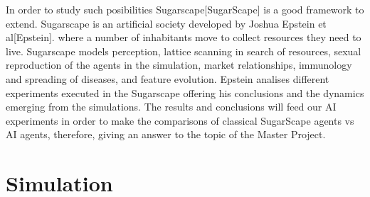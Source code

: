 \documentclass[11pt,oneside,a4paper,openright]{report}
\begin{document}
In order to study such posibilities Sugarscape[SugarScape] is a good framework to extend. Sugarscape is an artificial society developed by Joshua Epstein et al[Epstein]. where a number of inhabitants move to collect resources they need to live. Sugarscape models perception, lattice scanning in search of resources, sexual reproduction of the agents in the simulation, market relationships, immunology and spreading of diseases, and feature evolution. Epstein analises different experiments executed in the Sugarscape offering his conclusions and the dynamics emerging from the simulations. The results and conclusions will feed our AI experiments in order to make the comparisons of classical SugarScape agents vs AI agents, therefore, giving an answer to the topic of the Master Project.\\

\section{Simulation}
\end{document}
